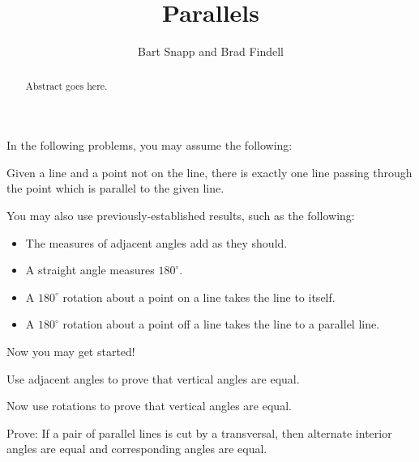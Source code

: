 \documentclass{ximera}
\title{Parallels}
\author{Bart Snapp and Brad Findell}
\begin{document}
\begin{abstract}
Abstract goes here.  
\end{abstract}
\maketitle

\begin{teachingnote}
\end{teachingnote}

In the following problems, you may assume the following: 

\begin{postulate}
Given a line and a point not on the line, there is exactly one line passing through the point which is parallel to the given line.
\end{postulate}

You may also use previously-established results, such as the following: 
\begin{itemize}
\itemsep -3pt
\item The measures of adjacent angles add as they should.
\item A straight angle measures $180^\circ$.  
\item A $180^\circ$ rotation about a point on a line takes the line to itself.  
\item A $180^\circ$ rotation about a point off a line takes the line to a parallel line.  
\end{itemize}

Now you may get started! 

\begin{problem}
Use adjacent angles to prove that vertical angles are equal.    
\end{problem}

\begin{problem}
Now use rotations to prove that vertical angles are equal.
\end{problem}


\begin{problem}
Prove:  If a pair of parallel lines is cut by a transversal, then alternate interior angles are equal and corresponding angles are equal.
\end{problem}
\end{document}

